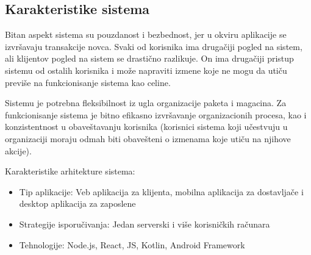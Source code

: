\subsection{Karakteristike sistema}

Bitan aspekt sistema su pouzdanost i bezbednost, jer u okviru aplikacije se izvršavaju transakcije novca.
Svaki od korisnika ima drugačiji pogled na sistem, ali klijentov pogled na sistem se drastično razlikuje. On ima drugačiji pristup sistemu od ostalih korisnika i može napraviti izmene koje ne mogu da utiču previše na funkcionisanje sistema kao celine. 

Sistemu je potrebna fleksibilnost iz ugla organizacije paketa i magacina. Za funkcionisanje sistema je bitno efikasno izvršavanje organizacionih procesa, kao i konzistentnost u obaveštavanju korisnika (korisnici sistema koji učestvuju u organizaciji moraju odmah biti obavešteni o izmenama koje utiču na njihove akcije).

Karakteristike arhitekture sistema:
\begin{itemize}
    \item Tip aplikacije: Veb aplikacija za klijenta, mobilna aplikacija za dostavljače i desktop aplikacija za zaposlene
    \item Strategije isporučivanja: Jedan serverski i više korisničkih računara
    \item Tehnologije: Node.js, React, JS, Kotlin, Android Framework
\end{itemize}

